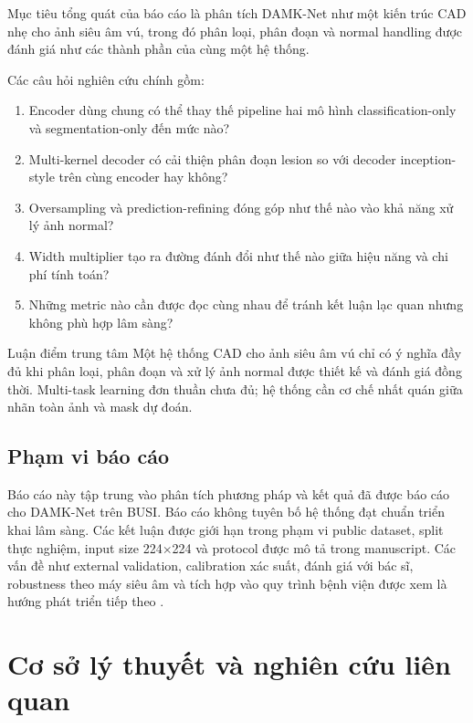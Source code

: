 \documentclass[12pt,a4paper,oneside]{report}
\newcommand{\modelname}{DAMK-Net}
\begin{document}
Mục tiêu tổng quát của báo cáo là phân tích \modelname{} như một kiến trúc CAD nhẹ cho ảnh siêu âm vú, trong đó phân loại, phân đoạn và normal handling được đánh giá như các thành phần của cùng một hệ thống.

Các câu hỏi nghiên cứu chính gồm:

\begin{enumerate}
  \item Encoder dùng chung có thể thay thế pipeline hai mô hình classification-only và segmentation-only đến mức nào?
  \item Multi-kernel decoder có cải thiện phân đoạn lesion so với decoder inception-style trên cùng encoder hay không?
  \item Oversampling và prediction-refining đóng góp như thế nào vào khả năng xử lý ảnh normal?
  \item Width multiplier tạo ra đường đánh đổi như thế nào giữa hiệu năng và chi phí tính toán?
  \item Những metric nào cần được đọc cùng nhau để tránh kết luận lạc quan nhưng không phù hợp lâm sàng?
\end{enumerate}

\begin{thesisbox}{Luận điểm trung tâm}
Một hệ thống CAD cho ảnh siêu âm vú chỉ có ý nghĩa đầy đủ khi phân loại, phân đoạn và xử lý ảnh normal được thiết kế và đánh giá đồng thời. Multi-task learning đơn thuần chưa đủ; hệ thống cần cơ chế nhất quán giữa nhãn toàn ảnh và mask dự đoán.
\end{thesisbox}

\section{Phạm vi báo cáo}

Báo cáo này tập trung vào phân tích phương pháp và kết quả đã được báo cáo cho \modelname{} trên BUSI. Báo cáo không tuyên bố hệ thống đạt chuẩn triển khai lâm sàng. Các kết luận được giới hạn trong phạm vi public dataset, split thực nghiệm, input size 224$\times$224 và protocol được mô tả trong manuscript. Các vấn đề như external validation, calibration xác suất, đánh giá với bác sĩ, robustness theo máy siêu âm và tích hợp vào quy trình bệnh viện được xem là hướng phát triển tiếp theo \citep{busi,damknet}.

\chapter{Cơ sở lý thuyết và nghiên cứu liên quan}
\end{document}
